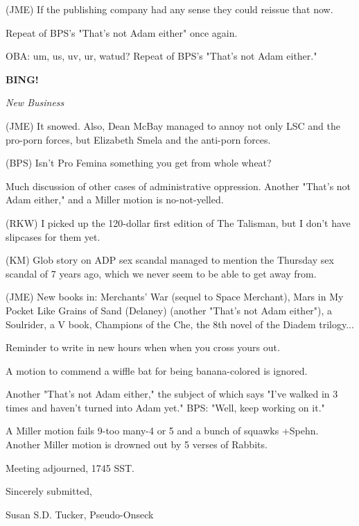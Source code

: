 \documentclass[12pt]{article}
\newcommand{\bing}{{\bf BING!} }
\newcommand{\goto}[1]{\bing \vskip 12pt \centerline{{\em{#1}}}}
\begin{document}
(JME) If the publishing company had any sense they could reissue that now.

Repeat of BPS's "That's not Adam either" once again.

OBA: um, us, uv, ur, watud? Repeat of BPS's "That's not Adam either."

\goto{New Business}

(JME) It snowed. Also, Dean McBay managed to annoy not only LSC and the pro-porn forces, but Elizabeth Smela and the anti-porn forces.

(BPS) Isn't Pro Femina something you get from whole wheat?

Much discussion of other cases of administrative oppression. Another "That's not Adam either," and a Miller motion is no-not-yelled.

(RKW) I picked up the 120-dollar first edition of The Talisman, but I don't have slipcases for them yet.

(KM) Glob story on ADP sex scandal managed to mention the Thursday sex scandal of 7 years ago, which we never seem to be able to get away from.

(JME) New books in: Merchants' War (sequel to Space Merchant), Mars in My Pocket Like Grains of Sand (Delaney) (another "That's not Adam either"), a Soulrider, a V book, Champions of the Che, the 8th novel of the Diadem trilogy...

Reminder to write in new hours when when you cross yours out.

A motion to commend a wiffle bat for being banana-colored is ignored.

Another "That's not Adam either," the subject of which says "I've walked in 3 times and haven't turned into Adam yet." BPS: "Well, keep working on it."

A Miller motion fails 9-too many-4 or 5 and a bunch of squawks +Spehn. Another Miller motion is drowned out by 5 verses of Rabbits.

\vspace{12pt}

\noindent
Meeting adjourned, 1745 SST.

\vspace{18pt}

\centerline{Sincerely submitted,}
\centerline{Susan S.D. Tucker, Pseudo-Onseck}
\end{document}
